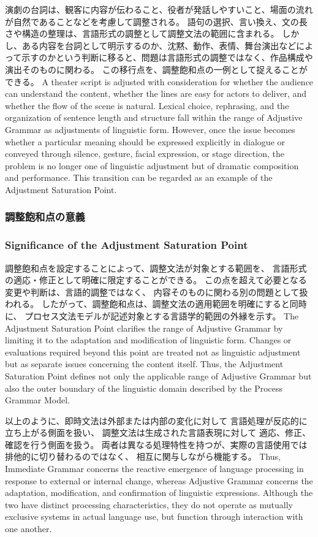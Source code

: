 \documentclass[a4paper]{article}
\begin{document}
\ifJPN
演劇の台詞は、観客に内容が伝わること、役者が発話しやすいこと、場面の流れが自然であることなどを考慮して調整される。
語句の選択、言い換え、文の長さや構造の整理は、言語形式の調整として調整文法の範囲に含まれる。
しかし、ある内容を台詞として明示するのか、沈黙、動作、表情、舞台演出などによって示すのかという判断に移ると、問題は言語形式の調整ではなく、作品構成や演出そのものに関わる。
この移行点を、調整飽和点の一例として捉えることができる。
\else
A theater script is adjusted with consideration for whether the audience can understand the content, whether the lines are easy for actors to deliver, and whether the flow of the scene is natural.
Lexical choice, rephrasing, and the organization of sentence length and structure fall within the range of Adjustive Grammar as adjustments of linguistic form.
However, once the issue becomes whether a particular meaning should be expressed explicitly in dialogue or conveyed through silence, gesture, facial expression, or stage direction, the problem is no longer one of linguistic adjustment but of dramatic composition and performance.
This transition can be regarded as an example of the Adjustment Saturation Point.
\fi

\ifJPN
\subsubsection{調整飽和点の意義}
\else
  \subsubsection{Significance of the Adjustment Saturation Point}
\fi

\ifJPN
調整飽和点を設定することによって、調整文法が対象とする範囲を、
言語形式の適応・修正として明確に限定することができる。
この点を超えて必要となる変更や判断は、言語的調整ではなく、
内容そのものに関わる別の問題として扱われる。
したがって、調整飽和点は、調整文法の適用範囲を明確にすると同時に、
プロセス文法モデルが記述対象とする言語学的範囲の外縁を示す。
\else
The Adjustment Saturation Point clarifies the range of Adjustive Grammar
by limiting it to the adaptation and modification of linguistic form.
Changes or evaluations required beyond this point are treated not as linguistic adjustment
but as separate issues concerning the content itself.
Thus, the Adjustment Saturation Point defines not only the applicable range of Adjustive Grammar
but also the outer boundary of the linguistic domain described by the Process Grammar Model.
\fi

\ifJPN
以上のように、即時文法は外部または内部の変化に対して
言語処理が反応的に立ち上がる側面を扱い、
調整文法は生成された言語表現に対して
適応、修正、確認を行う側面を扱う。
両者は異なる処理特性を持つが、実際の言語使用では排他的に切り替わるのではなく、
相互に関与しながら機能する。
\else
Thus, Immediate Grammar concerns the reactive emergence of language processing
in response to external or internal change,
whereas Adjustive Grammar concerns the adaptation, modification,
and confirmation of linguistic expressions.
Although the two have distinct processing characteristics,
they do not operate as mutually exclusive systems in actual language use,
but function through interaction with one another.
\fi
\end{document}

